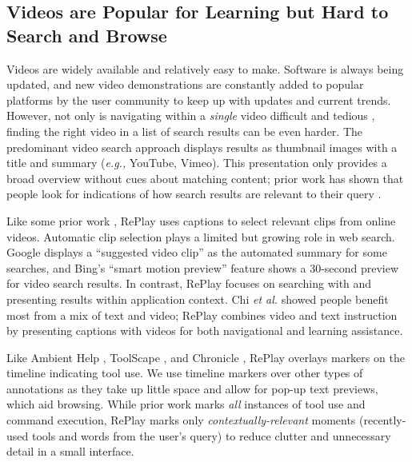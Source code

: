 \subsection{Videos are Popular for Learning but Hard to Search and Browse}
Videos are widely available and relatively easy to make. Software is always being updated, and new video demonstrations are constantly added to popular platforms by the user community to keep up with updates and current trends. 
However, not only is navigating within a \textit{single} video difficult and tedious \cite{Pavel2014, Pavel2015, Kim2014}, finding the right video in a list of search results can be even harder.
The predominant video search approach displays results as thumbnail images with a title and summary (\textit{e.g.,} YouTube, Vimeo). This presentation only provides a broad overview without cues about matching content; prior work has shown that people look for indications of how search results are relevant to their query \cite{Hearst2009Book}. 

Like some prior work \cite{Pavel2014, Pavel2015, Girgensohn2005}, RePlay uses captions to select relevant clips from online videos. Automatic clip selection plays a limited but growing role in web search. Google displays a ``suggested video clip'' \cite{Sullivan2018} as the automated summary for some searches, and Bing's ``smart motion preview'' feature \cite{Bing} shows a 30-second preview for video search results. In contrast, RePlay focuses on searching with and presenting results within application context. Chi \textit{et al.} \cite{Chi2012} showed people benefit most from a mix of text and video; RePlay combines video and text instruction by presenting captions with videos for both navigational and learning assistance.

Like Ambient Help \cite{Matejka2011}, ToolScape \cite{Kim2014}, and Chronicle \cite{Grossman2010}, RePlay overlays markers on the timeline indicating tool use. We use timeline markers over other types of annotations as they take up little space and allow for pop-up text previews, which aid browsing. While prior work marks \textit{all} instances of tool use and command execution, RePlay marks only \textit{contextually-relevant} moments (recently-used tools and words from the user's query) to reduce clutter and unnecessary detail in a small interface.


